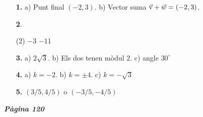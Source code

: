 \documentclass[a4paper, pdf, twoside]{book}
\begin{document}
\begin{multicols}{2}
\begin{enumerate}
\vspace{0.25cm}
\item[\fontfamily{phv}\selectfont\color{blue}\textbf{1. }]  \scalebox{0.6}{\simbolclau } 
a) Punt final $(-2, 3)$. b) Vector suma $\vec{\mathrm{v}} +\vec w=(-2, 3)$.
\vspace{0.25cm}



 \item[\fontfamily{phv}\selectfont\color{blue}\textbf{2}. ]  \scalebox{0.6}{\simbolclau } 
 \begin{tasks}[column-sep=1em, item-indent=1.3333em](2)
	 \task $-3$
	 \task $-11$
\end{tasks}
\vspace{0.25cm}
\item[\fontfamily{phv}\selectfont\color{blue}\textbf{3. }]  \scalebox{0.6}{\simbolclau } 
 a) $2\sqrt {3}$. b) Els dos tenen mòdul 2. c) angle $30^\circ $
\vspace{0.25cm}
\item[\fontfamily{phv}\selectfont\color{blue}\textbf{4. }]  \scalebox{0.6}{\simbolclau } 
a) $k=-2$. b) $k=\pm 4$. c) $k=-\sqrt {3}$
\vspace{0.25cm}
\item[\fontfamily{phv}\selectfont\color{blue}\textbf{5. }]  \scalebox{0.6}{\simbolclau } 
$(3/5, 4/5)$ o $(-3/5, -4/5)$
 \end{enumerate}
\vfill\null
\columnbreak
\def\currentname{Solucions del Tema 9}
\vspace*{0.75cm}

 

\vspace*{0.4cm}
 {}
\vspace{0.3cm}


{\textbf{\em Pàgina 120}} \hrulefill
\begin{enumerate}
\vspace{0.25cm}




\end{enumerate}
\end{multicols}
\end{document}
